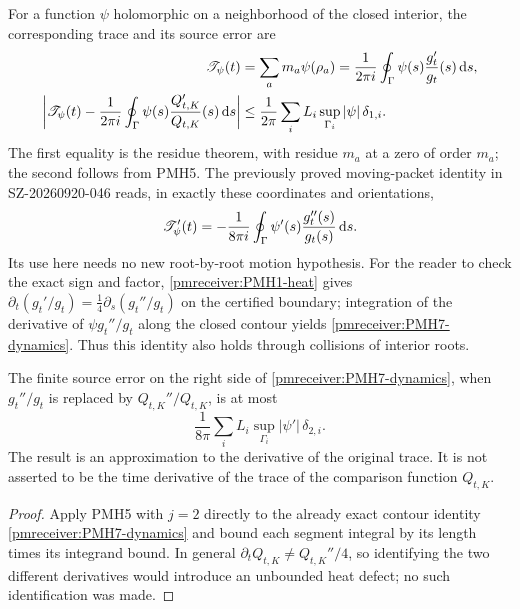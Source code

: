 For a function $\psi$ holomorphic on a neighborhood of the closed
interior, the corresponding trace and its source error are
\begin{align}
 \mathscr T_\psi(t)&=\sum_am_a\psi(\rho_a)
    =\frac1{2\pi i}\oint_\Gamma\psi(s)\frac{g_t'}{g_t}(s)\,\mathrm d s,
 \label{pmreceiver:PMH7-trace}\\
 \left|\mathscr T_\psi(t)-\frac1{2\pi i}
 \oint_\Gamma\psi(s)\frac{Q_{t,K}'}{Q_{t,K}}(s)\,\mathrm d s\right|
 &\le\frac1{2\pi}\sum_iL_i\sup_{\Gamma_i}|\psi|\,\delta_{1,i}.
 \label{pmreceiver:PMH7-traceerror}
\end{align}
The first equality is the residue theorem, with residue $m_a$ at a
zero of order $m_a$; the second follows from PMH5. The previously
proved moving-packet identity in SZ-20260920-046 reads, in exactly
these coordinates and orientations,
\begin{equation}\label{pmreceiver:PMH7-dynamics}
 \mathscr T_\psi'(t)=-\frac1{8\pi i}\oint_\Gamma
       \psi'(s)\frac{g_t''(s)}{g_t(s)}\,\mathrm d s.
\end{equation}
Its use here needs no new root-by-root motion hypothesis. For the
reader to check the exact sign and factor, \eqref{pmreceiver:PMH1-heat} gives
$\partial_t(g_t'/g_t)=\tfrac14\partial_s(g_t''/g_t)$ on the
certified boundary; integration of the derivative of
$\psi g_t''/g_t$ along the closed contour yields
\eqref{pmreceiver:PMH7-dynamics}. Thus this identity also holds through
collisions of interior roots.

\begin{pmreceivertheorem}
\label{pmreceiver:PMH7}
The finite source error on the right side of
\eqref{pmreceiver:PMH7-dynamics}, when $g_t''/g_t$ is replaced by
$Q_{t,K}''/Q_{t,K}$, is at most
\begin{equation}\label{pmreceiver:PMH7-timeerror}
 \frac1{8\pi}\sum_iL_i\sup_{\Gamma_i}|\psi'|\,\delta_{2,i}.
\end{equation}
The result is an approximation to the derivative of the original
trace. It is not asserted to be the time derivative of the trace
of the comparison function $Q_{t,K}$.
\end{pmreceivertheorem}
\begin{proof}
Apply PMH5 with $j=2$ directly to the already exact contour
identity \eqref{pmreceiver:PMH7-dynamics} and bound each segment integral by
its length times its integrand bound. In general
$\partial_tQ_{t,K}\ne Q_{t,K}''/4$, so identifying the two
different derivatives would introduce an unbounded heat defect;
no such identification was made.
\end{proof}

